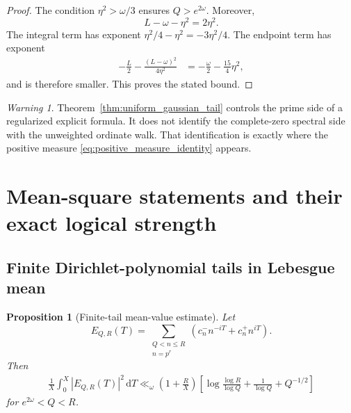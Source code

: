 \documentclass[11pt]{amsart}
\numberwithin{equation}{section}
\theoremstyle{plain}
\newtheorem{proposition}[theorem]{Proposition}
\theoremstyle{definition}
\theoremstyle{remark}
\newtheorem{warning}[theorem]{Warning}
\newcommand{\1}{\mathbf{1}}
\newcommand{\dd}{\,\mathrm{d}}
\begin{document}
\begin{proof}
The condition \(\eta^2>\omega/3\) ensures \(Q>e^{2\omega}\).  Moreover,
\begin{equation}
L-\omega-\eta^2=2\eta^2.
\label{eq:joint_choice_r}
\end{equation}
The integral term has exponent
\(\eta^2/4-\eta^2=-3\eta^2/4\).  The endpoint term has exponent
\begin{align}
-\frac L2-\frac{(L-\omega)^2}{4\eta^2}
&=
-\frac\omega2-\frac{15}{4}\eta^2,
\label{eq:joint_choice_endpoint_exponent}
\end{align}
and is therefore smaller.  This proves the stated bound.
\end{proof}

\begin{warning}
\label{warn:regularized_tail_not_ordinate_formula}
Theorem~\ref{thm:uniform_gaussian_tail} controls the prime side of a
regularized explicit formula.  It does not identify the complete-zero
spectral side with the unweighted ordinate walk.  That identification is
exactly where the positive measure \eqref{eq:positive_measure_identity}
appears.
\end{warning}

\section{Mean-square statements and their exact logical strength}
\label{sec:mean_square_logic}

\subsection{Finite Dirichlet-polynomial tails in Lebesgue mean}
\label{subsec:finite_dirichlet_mean}

\begin{proposition}[Finite-tail mean-value estimate]
\label{prop:finite_tail_mean_value}
Let
\begin{equation}
E_{Q,R}(T)
=
\sum_{\substack{Q<n\leq R\\n=p^r}}
\left(c_n^-n^{-iT}+c_n^+n^{iT}\right).
\label{eq:finite_tail_ER}
\end{equation}
Then
\begin{align}
\frac1X\int_0^X|E_{Q,R}(T)|^2\dd T
\ll_\omega
\left(1+\frac RX\right)
\left[
\log\frac{\log R}{\log Q}
+
\frac1{\log Q}
+
Q^{-1/2}
\right]
\label{eq:finite_tail_mean_value}
\end{align}
for $e^{2\omega}<Q<R$.
\end{proposition}
\end{document}
